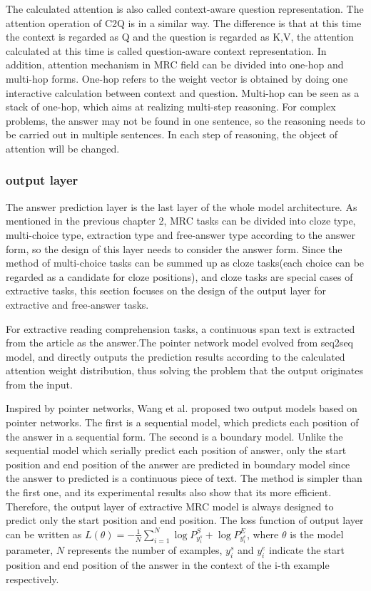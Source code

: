 \documentclass{article}
\begin{document}
The calculated attention is also called context-aware question representation. The attention operation of C2Q is in a similar way. The difference is that 
at this time the context is regarded as Q and the question is regarded as K,V, the attention calculated at this time is called question-aware context representation.
In addition, attention mechanism in MRC field can be divided into one-hop and multi-hop forms. One-hop refers to the weight vector is obtained by doing one interactive calculation 
between context and question. Multi-hop can be seen as a stack of one-hop, which aims at realizing multi-step reasoning. For complex problems, 
the answer may not be found in one sentence, so the reasoning needs to be carried out in multiple sentences. In each step of reasoning, the object of attention will be changed. 

\subsubsection{output layer}
The answer prediction layer is the last layer of the whole model architecture. As mentioned in the previous chapter 2, MRC tasks can be 
divided into cloze type, multi-choice type, extraction type and free-answer type according to the answer form, so the design of this layer needs to consider 
the answer form. Since the method of multi-choice tasks can be summed up as cloze tasks(each choice can be regarded as a candidate for cloze positions), and cloze tasks 
are special cases of extractive tasks, this section focuses on the design of the output layer for extractive and free-answer tasks.

For extractive reading comprehension tasks, a continuous span text is extracted from the article as the answer.The pointer network model evolved from seq2seq model, and directly outputs 
the prediction results according to the calculated attention weight distribution, thus solving the problem that the output originates from the input.

Inspired by pointer networks, Wang et al. proposed two output models based on pointer networks. The first is a sequential model, which predicts each position of the answer in a sequential 
form. The second is a boundary model. Unlike the sequential model which serially predict each position of answer, only the start position and end position of the answer are predicted in boundary model since the answer to predicted is a continuous piece of text. 
The method is simpler than the first one, and its experimental results also show that its more efficient. Therefore, the output layer of extractive MRC model is always designed to predict only the start position and end 
position. The loss function of output layer can be written as $L(\theta)=-\displaystyle\frac{1}{N}\sum_{i=1}^{N}\log P_{y_i^s}^{S}+\log P_{y_i^e}^E$, where $\theta$ is the model parameter, 
$N$ represents the number of examples, $y_i^s$ and $y_i^e$ indicate the start position and end position of the answer in the context of the i-th example respectively.
\end{document}
